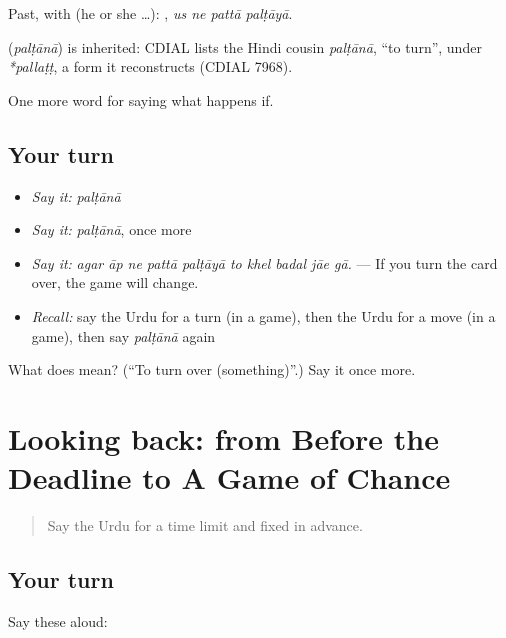 Past, with  (he or she …):    , \emph{us ne pattā palṭāyā}.

\begin{cousinweb}
\textbf{} (\emph{palṭānā}) is inherited: CDIAL lists the Hindi cousin \emph{palṭānā}, \textquotedblleft{}to turn\textquotedblright{}, under \emph{*pallaṭṭ}, a form it reconstructs (CDIAL 7968).
\end{cousinweb}

\begin{grammarlens}[title={What you've built}]
One more word for saying what happens if.
\end{grammarlens}

\subsection*{Your turn}
\begin{itemize}
\raggedright
  \item \emph{Say it:} \emph{palṭānā}
  \item \emph{Say it:} \emph{palṭānā}, once more
  \item \emph{Say it:} \emph{agar āp ne pattā palṭāyā to khel badal jāe gā.} — If you turn the card over, the game will change.
  \item \emph{Recall:} say the Urdu for a turn (in a game), then the Urdu for a move (in a game), then say \emph{palṭānā} again
\end{itemize}

\begin{tcolorbox}[breakable,colback=teal!4,colframe=teal!35!black,title={Before you move on}]
What does  mean? (\textquotedblleft{}To turn over (something)\textquotedblright{}.) Say it once more.
\end{tcolorbox}
\section[(dialogue)]{Looking back: from Before the Deadline to A Game of Chance}

\label{lesson:UR-R533-review-526-533}



\begin{quote}
Say the Urdu for a time limit and fixed in advance.
\end{quote}

\subsection*{Your turn}
Say these aloud:

